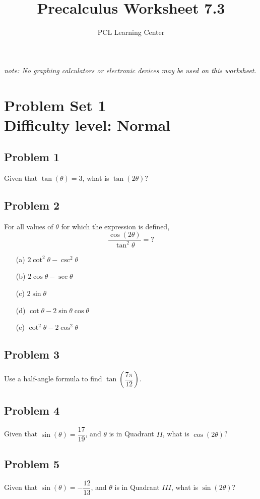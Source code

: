 \documentclass[12pt]{article}
\title{Precalculus Worksheet 7.3}
\author{PCL Learning Center}
\date{}
\begin{document}
\maketitle

\begin{center}
    \textit{note: No graphing calculators or electronic devices may be used on this worksheet.}    
\end{center}

\section*{Problem Set 1\\Difficulty level: Normal}

\subsection*{Problem 1}
Given that \(\tan(\theta)=3\), what is \(\tan(2\theta)\)?

\subsection*{Problem 2}
For all values of \(\theta\) for which the expression is defined,
\[\dfrac{\cos(2\theta)}{\tan^2\theta}=?\]
    \begin{enumerate}
    \item[(a)] \(2\cot^2\theta - \csc^2\theta\)
    \item[(b)] \(2\cos\theta - \sec\theta\)
    \item[(c)] \(2\sin\theta\)
    \item[(d)] \(\cot\theta - 2\sin\theta\cos\theta\)
    \item[(e)] \(\cot^2\theta - 2\cos^2\theta\)
    \end{enumerate}
    
\subsection*{Problem 3}
Use a half-angle formula to find \(\tan\left(\dfrac{7\pi}{12}\right)\).

\subsection*{Problem 4}
Given that \(\sin(\theta)=\dfrac{17}{19}\), and \(\theta\) is in Quadrant \(II\), what is \(\cos(2\theta)\)?

\subsection*{Problem 5}
Given that \(\sin(\theta)=-\dfrac{12}{13}\), and \(\theta\) is in Quadrant \(III\), what is \(\sin(2\theta)\)?
\end{document}
